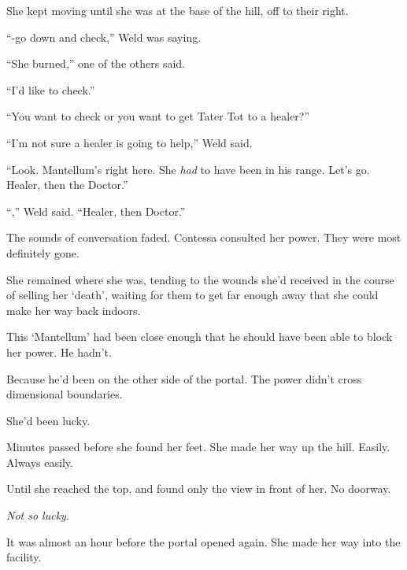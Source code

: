 She kept moving until she was at the base of the hill, off to their right.



``-go down and check,'' Weld was saying.



``She burned,'' one of the others said.



``I'd like to check.''



``You want to check or you want to get Tater Tot to a healer?''



``I'm not sure a healer is going to help,'' Weld said.



``Look.  Mantellum's right here.  She \emph{had} to have been in his range.  Let's go.  Healer, then the Doctor.''



``\ldotsRight,'' Weld said.  ``Healer, then Doctor.''



The sounds of conversation faded.  Contessa consulted her power.  They were most definitely gone.



She remained where she was, tending to the wounds she'd received in the course of selling her `death', waiting for them to get far enough away that she could make her way back indoors.



This `Mantellum' had been close enough that he should have been able to block her power.  He hadn't.



Because he'd been on the other side of the portal.  The power didn't cross dimensional boundaries.



She'd been lucky.



Minutes passed before she found her feet.  She made her way up the hill.  Easily.  Always easily.



Until she reached the top, and found only the view in front of her.  No doorway.



\emph{Not so lucky}.



\blacksquare



It was almost an hour before the portal opened again.  She made her way into the facility.



